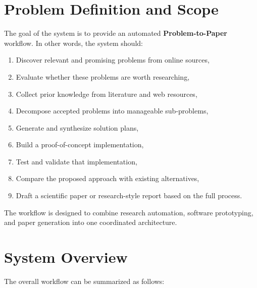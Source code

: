 \documentclass[11pt,a4paper]{article}
\begin{document}
\section{Problem Definition and Scope}

The goal of the system is to provide an automated \textbf{Problem-to-Paper} workflow. In other words, the system should:

\begin{enumerate}[label=\arabic*.]
    \item Discover relevant and promising problems from online sources,
    \item Evaluate whether these problems are worth researching,
    \item Collect prior knowledge from literature and web resources,
    \item Decompose accepted problems into manageable sub-problems,
    \item Generate and synthesize solution plans,
    \item Build a proof-of-concept implementation,
    \item Test and validate that implementation,
    \item Compare the proposed approach with existing alternatives,
    \item Draft a scientific paper or research-style report based on the full process.
\end{enumerate}

The workflow is designed to combine research automation, software prototyping, and paper generation into one coordinated architecture.

\section{System Overview}

The overall workflow can be summarized as follows:
\end{document}
